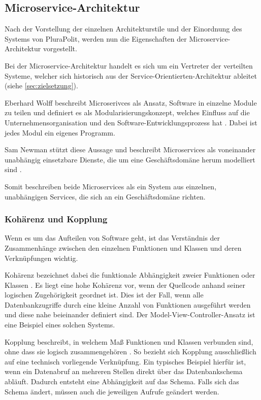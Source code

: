 \subsection{Microservice-Architektur}
\label{sec:microservices}

Nach der Vorstellung der einzelnen Architekturstile und der Einordnung des Systems von PluraPolit, werden nun die Eigenschaften der Microservice-Architektur vorgestellt.

Bei der Microservice-Architektur handelt es sich um ein Vertreter der verteilten Systeme, welcher sich historisch aus der Service-Orientierten-Architektur ableitet (siehe \cref{sec:zielsetzung}).

Eberhard Wolff beschreibt Microserivces als Ansatz, Software in einzelne Module zu teilen und definiert es als Modularisierungskonzept, welches Einfluss auf die Unternehmensorganisation und den Software-Entwicklungsprozess hat \parencite[vgl.][Kap. 1.1]{wolff_microservices_2018}. Dabei ist jedes Modul ein eigenes Programm.

Sam Newman stützt diese Aussage und beschreibt Microservices als voneinander unabhängig einsetzbare Dienste, die um eine Geschäftsdomäne herum modelliert sind \parencite[vgl.][Kap. 2.1]{newman_monolith_2019}.

Somit beschreiben beide Microservices als ein System aus einzelnen, unabhängigen Services, die sich an ein Geschäftsdomäne richten.

\subsubsection{Kohärenz und Kopplung}

Wenn es um das Aufteilen von Software geht, ist das Verständnis der Zusammenhänge zwischen den einzelnen Funktionen und Klassen und deren Verknüpfungen wichtig.

Kohärenz bezeichnet dabei die funktionale Abhängigkeit zweier Funktionen oder Klassen \parencite[vgl.][Kap. 2.3.1]{newman_monolith_2019}.
Es liegt eine hohe Kohärenz vor, wenn der Quellcode anhand seiner logischen Zugehörigkeit geordnet ist.
Dies ist der Fall, wenn alle Datenbankzugriffe durch eine kleine Anzahl von Funktionen ausgeführt werden und diese nahe beieinander definiert sind. Der Model-View-Controller-Ansatz ist eine Beispiel eines solchen Systems.

Kopplung beschreibt, in welchem Maß Funktionen und Klassen verbunden sind, ohne dass sie logisch zusammengehören \parencite[vgl.][Kap. 2.3.2]{newman_monolith_2019}. So bezieht sich Kopplung ausschließlich auf eine technisch vorliegende Verknüpfung. Ein typisches Beispiel hierfür ist, wenn ein Datenabruf an mehreren Stellen direkt über das Datenbankschema abläuft. Dadurch entsteht eine Abhängigkeit auf das Schema. Falls sich das Schema ändert, müssen auch die jeweiligen Aufrufe geändert werden.

